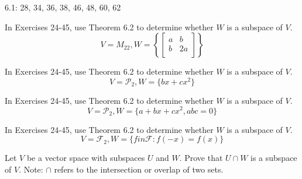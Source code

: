 \documentclass[11pt,letterpaper,boxed]{pset}
\begin{document}
    \begin{center}
        6.1: 28, 34, 36, 38, 46, 48, 60, 62 \\
    \end{center}
    
    
    \begin{problem}[6.1 \#28]
    In Exercises 24-45, use Theorem 6.2 to determine whether $W$ is a subspace of $V$.
    \[V = M_{22}, W = 
    \left \{
    \begin{bmatrix}
    a & b  \\
    b & 2a \\
    \end{bmatrix}
    \right \}
    \]
    \end{problem}
    \newpage
    
    
    \begin{problem}[6.1 \#34]
    In Exercises 24-45, use Theorem 6.2 to determine whether $W$ is a subspace of $V$.
    \[V = \mathscr{P}_2, W = \{bx+cx^2 \}\]
    \end{problem}
    \newpage
    
    
    \begin{problem}[6.1 \#36]
    In Exercises 24-45, use Theorem 6.2 to determine whether $W$ is a subspace of $V$.
    \[V = \mathscr{P}_2, W = \{a+bx+cx^2, abc=0 \}\]
    \end{problem}
    \newpage
    
    
    \begin{problem}[6.1 \#38]
    In Exercises 24-45, use Theorem 6.2 to determine whether $W$ is a subspace of $V$.
    \[V = \mathscr{F}_2, W = \{f in \mathscr{F}: f(-x)=f(x) \}\]
    \end{problem}
    \newpage
    
    
    \begin{problem}[6.1 \#46]
    Let $V$ be a vector space with subspaces $U$ and $W$. Prove that $U \cap W$ is a subspace of $V$. Note: $\cap$ refers to the intersection or overlap of two sets.
    \end{problem}
    \newpage
    
\end{document}
